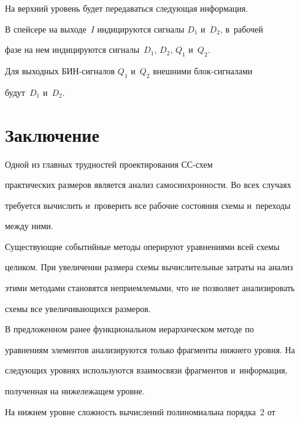    


   На верхний уровень будет передаваться следующая информация.


   


   В спейсере на выходе~$I$ индицируются сигналы $D_1$ и~$D_2$, в~рабочей 


фазе на нем индицируются сигналы~$D_1$, $D_2$, $Q_1$ и~$Q_2$.


   


   Для выходных БИН-сигналов $Q_1$ и~$Q_2$ внешними блок-сигналами 


будут~$D_1$ и~$D_2$.


   


\section{Заключение}


       


   Одной из главных трудностей проектирования СС-схем 


практических размеров является анализ самосинхронности. Во всех случаях 


требуется вычислить и~проверить все рабочие состояния схемы и~переходы 


между ними.


   


   Существующие событийные методы оперируют уравнениями всей схемы 


целиком. При увеличении размера схемы вычислительные затраты на анализ 


этими методами становятся неприемлемыми, что не позволяет анализировать 


схемы все увеличивающихся размеров.


   


   В предложенном ранее функциональном иерархическом методе по 


уравнениям элементов анализируются только фрагменты нижнего уровня. На 


следующих уровнях используются взаимосвязи фрагментов и~информация, 


полученная на нижележащем уровне.


   


   На нижнем уровне сложность вычислений полиномиальна порядка~2 от 



